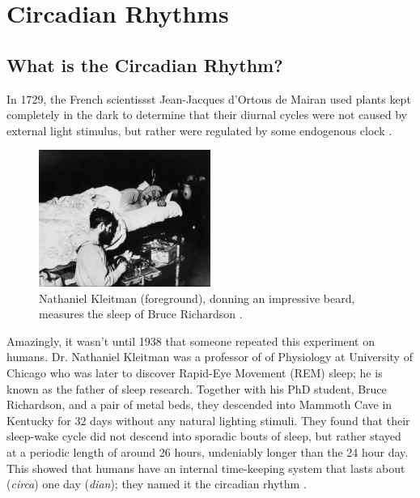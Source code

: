 \section{Circadian Rhythms}
\label{sec:Circadian}

\subsection{What is the Circadian Rhythm?}

In 1729, the French scientissst Jean-Jacques d'Ortous de Mairan	used plants kept completely in the dark to determine that their diurnal cycles were not caused by external light stimulus, but rather were regulated by some endogenous clock \citep{demairanObservationBotanique1729}. 

\begin{figure}
	\includegraphics[width=0.5\textwidth]{Images/KleitmanCave}
	\caption{Nathaniel Kleitman (foreground), donning an impressive beard, measures the sleep of  Bruce Richardson \citep{universityofchicagophotographicarchiveKleitmanNathanielPhotographic}.}
	\label{Fig:Cave}
\end{figure}

Amazingly, it wasn't until 1938 that someone repeated this experiment on humans. Dr. Nathaniel Kleitman was a professor of of Physiology at University of Chicago who was later to discover Rapid-Eye Movement (REM) sleep; he is known as the father of sleep research. Together with his PhD student, Bruce Richardson, and a pair of metal beds, they descended into Mammoth Cave in Kentucky for 32 days without any natural lighting stimuli. They found that their sleep-wake cycle did not descend into sporadic bouts of sleep, but rather stayed at a periodic length of around 26 hours, undeniably longer than the 24 hour day. This showed that humans have an internal time-keeping system that lasts about (\textit{circa}) one day (\textit{dian}); they named it the circadian rhythm \citep{kleitmanSleepWakefulness1987}.

